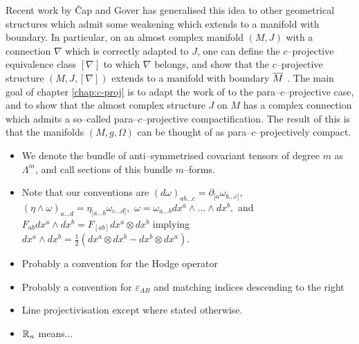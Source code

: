 Recent work by \v Cap and Gover \cite{CG0,CG} has generalised this idea to other geometrical structures which admit some weakening which extends to a manifold with boundary. In particular, on an almost complex manifold $(M,J)$ with a connection $\nabla$ which is correctly adapted to $J$, one can define the $c$--projective equivalence class $[\nabla]$ to which $\nabla$ belongs, and show that the $c$--projective structure $(M,J,[\nabla])$ extends to a manifold with boundary $\overline{M}$ \cite{CG}. The main goal of chapter \ref{chap:c-proj} is to adapt the work of \cite{CG} to the para--$c$--projective case, and to show that the almost complex structure $J$ on $M$ has a complex connection which admits a so--called para--$c$--projective compactification. The result of this is that the manifolds $(M,g,\Omega)$ can be thought of as para--$c$--projectively compact.

\begin{itemize}
\item We denote the bundle of anti--symmetrised covariant tensors of degree $m$ as $\Lambda^m$, and call sections of this bundle $m$--forms.
\item Note that our conventions are $(d\omega)_{ab\dots c}=\partial_{[a}\omega_{b\dots c]},$
$(\eta\wedge\omega)_{a\dots d}=\eta_{[a\dots b}\omega_{c\dots d]},$
$\omega=\omega_{a\dots b}dx^{a}\wedge\dots\wedge dx^{b},$
and $F_{ab}{d}x^{a}\wedge{d}x^{b}=F_{[ab]}{d}x^{a}\otimes{d}x^{b}$
implying ${d}x^{a}\wedge{d}x^{b}=\frac{1}{2}({d}x^{a}\otimes{d}x^{b}-{d}x^{b}\otimes{d}x^{a})$.
\item Probably a convention for the Hodge operator
\item Probably a convention for $\varepsilon_{AB}$ and matching indices descending to the right
\item Line projectivisation except where stated otherwise.
\item $\mathbb{R}_n$ means...
\end{itemize}






